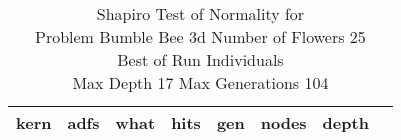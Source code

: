 \begin{table}[H]
\caption{Shapiro Test of Normality for \\ Problem  Bumble Bee 3d  Number of Flowers 25\\Best of Run Individuals \\ Max Depth 17 Max Generations 104\\}
\begin{center}
\scalebox{0.8} %
{
\begin{tabular}{lrrrrrrr}
\hline
kern & adfs & what & hits & gen & nodes & depth \\
\hline


\end{tabular}
}
\end{center}
\end{table}

